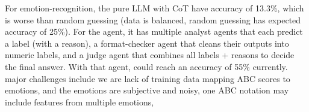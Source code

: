 \documentclass[11pt]{article} %
\begin{document}
For emotion-recognition, the pure LLM with CoT have accuracy of 13.3\%, which is worse than random guessing (data is balanced, random guessing has expected accuracy of 25\%). For the agent, it has multiple analyst agents that each predict a label (with a reason), a format-checker agent that cleans their outputs into numeric labels, and a judge agent that combines all labels + reasons to decide the final answer. With that agent, could reach an accuracy of 55\% currently. major challenges include we are lack of training data mapping ABC scores to emotions, and the emotions are subjective and noisy, one ABC notation may include features from multiple emotions,
\end{document}
